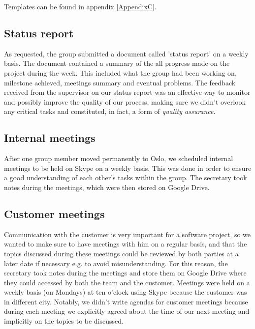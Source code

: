 Templates can be found in appendix \ref{AppendixC}.

\subsection{Status report}
As requested, the group submitted a document called 'status report' on a weekly basis.
The document contained a summary of the all progress made on the project during the week.
This included what the group had been working on, milestone achieved, meetings summary and eventual problems.
The feedback received from the supervisor on our status report was an effective way to monitor and possibly improve
the quality of our process, making sure we didn't overlook any critical tasks and constituted, in fact, a form of
\textit{quality assurance}.

\subsection{Internal meetings}
After one group member moved permanently to Oslo, we scheduled internal meetings to be held on Skype
on a weekly basis. This was done in order to ensure a good understanding of each other's tasks within the group.
The secretary took notes during the meetings, which were then stored on Google Drive.

\subsection{Customer meetings}
Communication with the customer is very important for a software project, so we wanted to make sure to have meetings
with him on a regular basis, and that the topics discussed during these meetings could be reviewed by
both parties at a later date if necessary e.g. to avoid misunderstanding.
For this reason, the secretary took notes during the meetings and store them on Google Drive where they
could accessed by both the team and the customer. Meetings were held on a weekly basis (on Mondays) at ten o'clock using
Skype because the customer was in different city.
Notably, we didn't write agendas for customer meetings because during each meeting we explicitly
agreed about the time of our next meeting and implicitly on the topics to be discussed.


